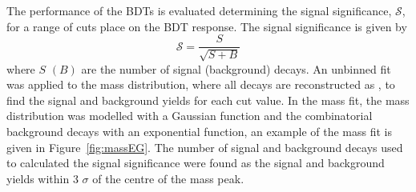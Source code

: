 The performance of the BDTs is evaluated determining the signal significance, $\mathcal{S}$, for a range of cuts place on the BDT response. The signal significance is given by
\begin{equation}
\mathcal{S} = \frac{S}{\sqrt{S+B}}
\label{eq:SigSigf}
\end{equation}
where $S$ $(B)$ are the number of signal (background) decays.
An unbinned \ml fit was applied to the \bhh mass distribution, where all \bhh decays are reconstructed as \bsmumu, to find the signal and background yields for each cut value. %
In the mass fit, the \bhh mass distribution was modelled with a Gaussian function and the combinatorial background decays with an exponential function, an example of the mass fit is given in Figure~\ref{fig:massEG}. 
The number of signal and background decays used to calculated the signal significance were found as the signal and background yields within 3 $\sigma$ of the centre of the \bhh mass peak.

